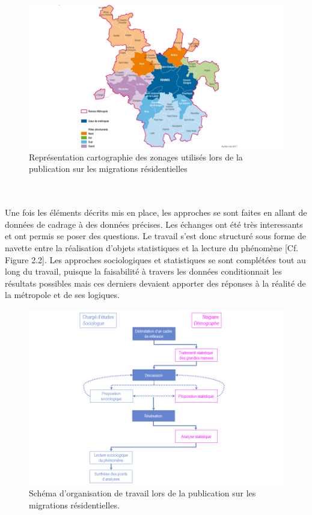 \documentclass{bredele}
\begin{document}
\begin{figure}\centering
\includegraphics[width=\textwidth]{CARTOZONAGE}
\caption{Représentation cartographie des zonages utilisés lors de la publication sur les migrations résidentielles}
\begin{flushright}
\end{flushright}
\end{figure}
\\\\Une fois les éléments décrits mis en place, les approches se sont faites en allant de données de cadrage à des données précises. Les échanges ont été très interessants et ont permis se poser des questions. Le travail s’est donc structuré sous forme de navette entre la réalisation d'objets statistiques et la lecture du phénomène [Cf. Figure 2.2]. Les approches sociologiques et statistiques se sont complétées tout au long du travail, puisque la faisabilité à travers les données conditionnait les résultats possibles mais ces derniers devaient apporter des réponses à la réalité de la métropole et de ses logiques.
\begin{figure}\centering
\includegraphics[width=\textwidth]{ORGAMISSION2.png}
\caption{Schéma d'organisation de travail lors de la publication sur les migrations résidentielles.}
\end{figure}
\end{document}
